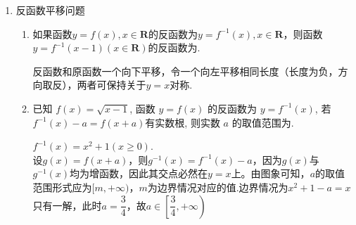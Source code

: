 \begin{enumerate}
\begin{enumerate}
        \begin{jieda}
            由反函数的对称中心知$f(x)$的对称中心为$(3, -1)$，因此$a+1 = 3$，故$a = 2$
        \end{jieda}
    \end{enumerate}
    \item 反函数平移问题
    \begin{enumerate}
        \item 如果函数$y = f(x), x \in \mathbf{R}$的反函数为$y = f^{-1}(x), x \in \mathbf{R}$，则函数$y = f^{-1}(x-1)(x\in \mathbf{R})$的反函数为.
        \begin{jieda}
            反函数和原函数一个向下平移，令一个向左平移相同长度（长度为负，方向取反），两者可保持关于$y = x$对称.
        \end{jieda}
        \item 已知 $f(x)=\sqrt{x-1}$, 函数 $y=f(x)$ 的反函数为 $y=f^{-1}(x)$, 若 $f^{-1}(x)-a=f(x+a)$有实数根, 则实数 $a$ 的取值范围为\blkda{$\left[\dfrac{3}{4}, +\infty\right)$}.
        \begin{jieda}
            $f^{-1}(x) = x^2 + 1 (x \geq 0)$. \\
            设$g(x) = f(x+a)$，则$g^{-1}(x) = f^{-1}(x)-a$，因为$g(x)$与$g^{-1}(x)$均为增函数，因此其交点必然在$y = x$上。由图象可知，$a$的取值范围形式应为$[m, +\infty)$，$m$为边界情况对应的值.边界情况为$x^2 + 1 - a = x$只有一解，此时$a = \dfrac{3}{4}$，故$a \in \left[\dfrac{3}{4}, +\infty\right)$ 
        \end{jieda}
    \end{enumerate}
\end{enumerate}